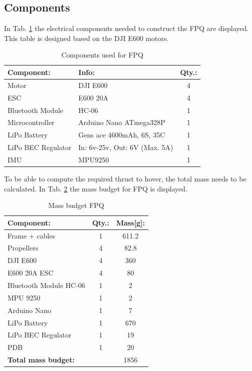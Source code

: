 \subsection{Components}
In Tab. \ref{tab:CompFPQ} the electrical components needed to construct the FPQ are displayed. This table is designed based on the DJI E600 motors. 
\begin{table}[H]
    \begin{center}
    \caption{Components used for FPQ} 
    \label{tab:CompFPQ} 
        \begin{tabular}{|l|l|c|}
            \hline 
            \textbf{Component:} & \textbf{Info:} & \textbf{Qty.:}  \\ 
            \hline
            Motor & DJI E600  & 4 \\
            ESC & E600 20A & 4 \\
            Bluetooth Module & HC-06 & 1  \\
            Microcontroller & Arduino Nano  ATmega328P& 1 \\
            LiPo Battery & Gens ace 4600mAh, 6S, 35C & 1 \\
            LiPo BEC Regulator & In: 6v-25v, Out: 6V (Max. 5A)  & 1\\
            IMU & MPU9250 & 1 \\
            \hline
        \end{tabular}
    \end{center}
\end{table}
\noindent
To be able to compute the required thrust to hover, the total mass needs to be calculated. In Tab. \ref{tab:WeightFPQ} the mass budget for FPQ is displayed.
\begin{table}[H]
    \begin{center}
    \caption{Mass budget FPQ} 
    \label{tab:WeightFPQ} 
        \begin{tabular}{|l|c|c|}
            \hline 
            \textbf{Component:} & \textbf{Qty.:} & \textbf{Mass[g]:}  \\ 
            \hline
            Frame + cables & 1 & 611.2\\
            Propellers & 4 & 82.8\\
            DJI E600  & 4 & 360 \\
            E600 20A ESC & 4 & 80 \\
            Bluetooth Module HC-06 & 1 & 2\\
            MPU 9250 & 1 & 2 \\
            Arduino Nano & 1 & 7 \\
            LiPo Battery & 1 & 670 \\
            LiPo BEC Regulator & 1 & 19 \\
            PDB & 1 & 20 \\\hline
            \textbf{Total mass budget:} & & 1856\\
            \hline
        \end{tabular}
    \end{center}
\end{table}

